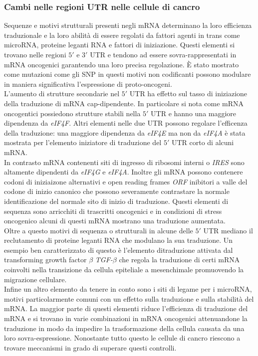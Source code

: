 		\subsubsection{Cambi nelle regioni UTR nelle cellule di cancro}
		\label{subsubsec:53UTRcomp}
		Sequenze e motivi strutturali presenti negli mRNA determinano la loro efficienza traduzionale e la loro abilit\`a di essere regolati da fattori agenti in trans come microRNA, proteine leganti RNA e fattori di iniziazione.
		Questi elementi si trovano nelle regioni $5'$ e $3'$ UTR e tendono ad essere sovra-rappresentati in mRNA oncogenici garantendo una loro precisa regolazione.
		\`E stato mostrato come mutazioni come gli SNP in questi motivi non codificanti possono modulare in maniera significativa l'espressione di proto-oncogeni.\\
		L'aumento di strutture secondarie nel $5'$ UTR ha effetto sul tasso di iniziazione della traduzione di mRNA cap-dipendente.
		In particolare si nota come mRNA oncogentici possiedono strutture stabili nella $5'$ UTR e hanno una maggiore dipendenza da \emph{eIF4F}.
		Altri elementi nelle due UTR possono regolare l'efficenza della traduzione: una maggiore dipendenza da \emph{eIF4E} ma non da \emph{eIF4A} \`e stata mostrata per l'elemento iniziatore di traduzione del $5'$ UTR corto di alcuni mRNA.\\
		In contrasto mRNA contenenti siti di ingresso di ribosomi interni o \emph{IRES} sono altamente dipendenti da \emph{eIF4G} e \emph{eIF4A}.
		Inoltre gli mRNA possono contenere codoni di iniziaizone alternativi e open reading frames \emph{ORF} inibitori a valle del codone di inizio canonico che possono severamente contrastare la normale identificazione del normale sito di inizio di traduzione.
		Questi elementi di sequenza sono arricchiti di trascritti oncogenici e in condizioni di stress oncogenico alcuni di questi mRNA mostrano una traduzione aumentata.\\
		Oltre a questo motivi di sequenza o strutturali in alcune delle $5'$ UTR mediano il reclutamento di proteine leganti RNA che modulano la sua traduzione.
		Un esempio ben caratterizzato di questo \`e l'elemento ditraduzione attivata dal transforming growth factor $\beta$ \emph{TGF-$\beta$} che regola la traduzione di certi mRNA coinvolti nella transizione da cellula epiteliale a mesenchimale promuovendo la migrazione cellulare.\\
		Infine un altro elemento da tenere in conto sono i siti di legame per i microRNA, motivi particolarmente comuni con un effetto sulla traduzione e sulla stabilit\`a del mRNA.
		La maggior parte di questi elementi riduce l'efficienza di traduzione del mRNA e si trovano in varie combinazioni in mRNA oncogenici attenuandone la traduzione in modo da impedire la trasformazione della cellula causata da una loro sovra-espressione.
		Nonostante tutto questo le cellule di cancro riescono a trovare meccanismi in grado di superare questi controlli.\\

